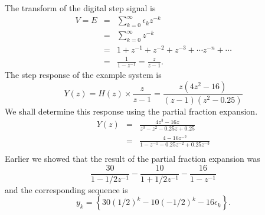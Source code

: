 The transform of the digital step signal is
\begin{eqnarray}\label{eq:l10e6}
  V = E &=& \sum_{k=0}^{\infty}\epsilon_k z^{-k}\\
        &=& \sum_{k=0}^{\infty} z^{-k}\nonumber \\
        &=& 1 + z^{-1} + z^{-2} + z^{-3} + \cdots z^{-n} + \cdots \nonumber\\
        &=& \frac{1}{1-z^{-1}} = \frac{z}{z-1}.
\end{eqnarray}
The step response of the example system is
\[ Y(z) = H(z)\times \frac{z}{z-1} = \frac{z(4z^2 - 16)}{(z-1)(z^2 - 0.25)}\]
We shall determine this response using the partial fraction
expansion.
\begin{eqnarray*}
Y(z) &=& \frac{4z^3 - 16z}{z^3 - z^2 - 0.25z + 0.25}\\
 &=& \frac{4 - 16z^{-2}}{1 - z^{-1} - 0.25z^{-2} + 0.25z^{-3}}\\
\end{eqnarray*}
Earlier we showed that the result of the partial
fraction expansion was
\[\frac{30}{1-1/2 z^{-1}} - \frac{10}{1+1/2z^{-1}} -
\frac{16}{1-z^{-1}}\] and the corresponding sequence is
\[y_k = \left\{30(1/2)^k -10(-1/2)^k -16\epsilon_k\right\}.\]


\endinput

